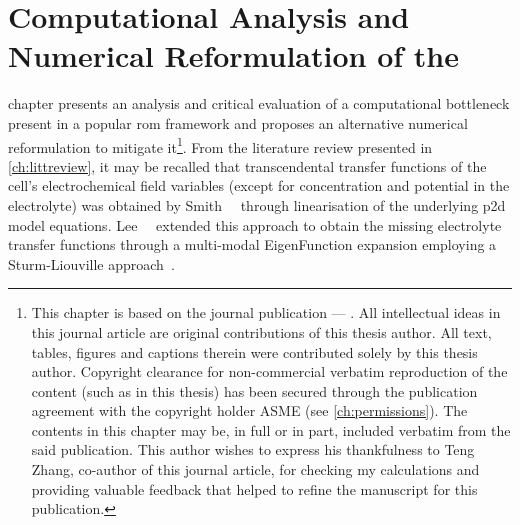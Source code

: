 
\chapter{Computational Analysis and Numerical Reformulation of the }\label{ch:improveddra}
\startcontents[chapters]

\bigskip

 chapter presents  an analysis and critical  evaluation of a
computational bottleneck present  in a popular \gls{rom}  framework and proposes
an  alternative numerical  reformulation  to  mitigate it\footnote{This  chapter
is  based  on the  journal  publication  --- .  All
intellectual  ideas  in  this  journal article  are  original  contributions  of
this  thesis  author.  All  text,  tables, figures  and  captions  therein  were
contributed solely by this thesis author. Copyright clearance for non-commercial
verbatim  reproduction  of  the  content  (such as  in  this  thesis)  has  been
secured  through  the  publication  agreement with  the  copyright  holder  ASME
(see \cref{ch:permissions}). The contents in this chapter  may be, in full or in
part, included verbatim from the said publication. This author wishes to express
his  thankfulness  to  Teng  Zhang,  co-author  of  this  journal  article,  for
checking  my  calculations  and  providing  valuable  feedback  that  helped  to
refine  the  manuscript  for  this publication.}.  From  the  literature  review
presented  in \cref{ch:littreview},  it  may  be  recalled  that  transcendental
transfer  functions  of  the  cell's  electrochemical  field  variables  (except
for  concentration   and  potential   in  the   electrolyte)  was   obtained  by
Smith~\etal~\cite{Smith2007} through  linearisation of the  underlying \gls{p2d}
model  equations. Lee~\etal~\cite{Lee2012a,Lee2012}  extended  this approach  to
obtain  the  missing  electrolyte   transfer  functions  through  a  multi-modal
EigenFunction expansion employing a Sturm-Liouville approach~\cite{Pryce1993}.


